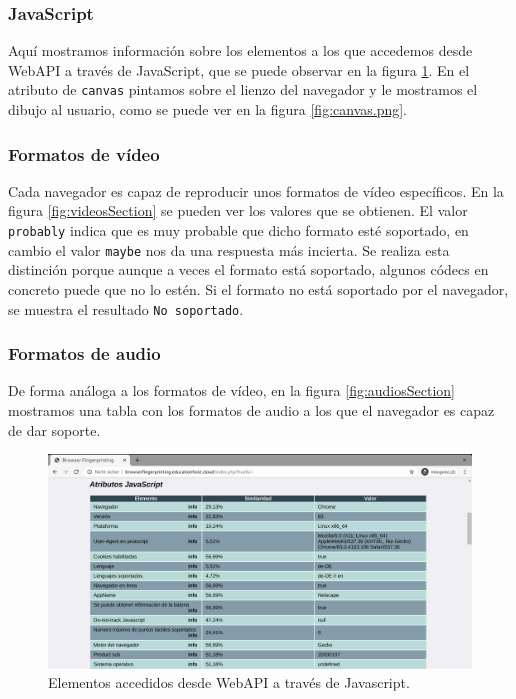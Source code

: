 \subsubsection{JavaScript}

Aquí mostramos información sobre los elementos a los que accedemos desde WebAPI a través de JavaScript, que se puede observar en la figura \ref{fig:javaScriptSection.png}. En el atributo de \texttt{canvas} pintamos sobre el lienzo del navegador y le mostramos el dibujo al usuario, como se puede ver en la figura \ref{fig:canvas.png}.

\subsubsection{Formatos de vídeo}
Cada navegador es capaz de reproducir unos formatos de vídeo específicos. En la figura \ref{fig:videosSection} se pueden ver los valores que se obtienen. El valor \texttt{probably} indica que es muy probable que dicho formato esté soportado, en cambio el valor \texttt{maybe} nos da una respuesta más incierta. Se realiza esta distinción porque aunque a veces el formato está soportado, algunos códecs en concreto puede que no lo estén. Si el formato no está soportado por el navegador, se muestra el resultado \texttt{No soportado}.

\subsubsection{Formatos de audio}
De forma análoga a los formatos de vídeo, en la figura \ref{fig:audiosSection} mostramos una tabla con los formatos de audio a los que el navegador es capaz de dar soporte.

\begin{figure}[tbp]
	\centering
	\includegraphics[width=1\textwidth]{Images/javaScriptSection.png}
	\caption{Elementos accedidos desde WebAPI a través de Javascript.}
	\label{fig:javaScriptSection.png}
\end{figure}


